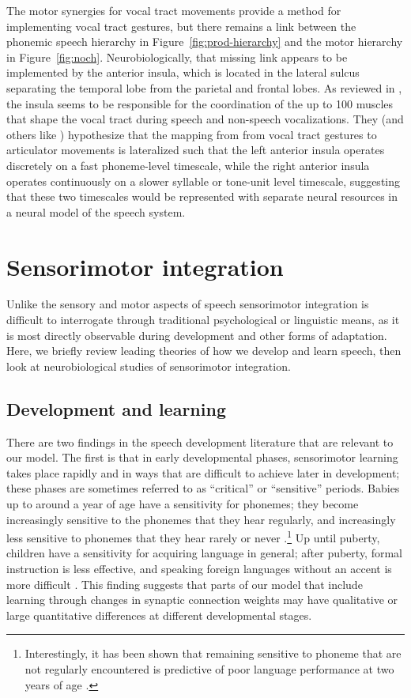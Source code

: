 
The motor synergies for vocal tract movements
provide a method for implementing
vocal tract gestures,
but there remains a link
between the phonemic
speech hierarchy in Figure~\ref{fig:prod-hierarchy}
and the motor hierarchy
in Figure~\ref{fig:noch}.
Neurobiologically,
that missing link appears to be
implemented by the anterior insula,
which is located in the lateral sulcus
separating the temporal lobe from
the parietal and frontal lobes.
As reviewed in \citet{ackermann2004},
the insula seems to be responsible
for the coordination of the up to 100 muscles
that shape the vocal tract during speech
and non-speech vocalizations.
They (and others like \citealt{ivry1998})
hypothesize that the mapping from
from vocal tract gestures to articulator movements
is lateralized such that
the left anterior insula operates
discretely on a fast phoneme-level timescale,
while the right anterior insula
operates continuously on a slower
syllable or tone-unit level timescale,
suggesting that these two timescales
would be represented
with separate neural resources
in a neural model of the speech system.

\section{Sensorimotor integration}

Unlike the sensory and motor aspects of speech
sensorimotor integration
is difficult to interrogate through
traditional psychological or linguistic means,
as it is most directly observable
during development and other forms of adaptation.
Here, we briefly review leading theories
of how we develop and learn speech,
then look at neurobiological studies
of sensorimotor integration.

\subsection{Development and learning}

There are two findings in the
speech development literature
that are relevant to our model.
The first is that in
early developmental phases,
sensorimotor learning
takes place rapidly
and in ways that are difficult
to achieve later in development;
these phases are sometimes referred
to as ``critical'' or ``sensitive'' periods.
Babies up to around a year of age
have a sensitivity for phonemes;
they become increasingly sensitive
to the phonemes that they hear regularly,
and increasingly less sensitive
to phonemes that they hear rarely or never
\citep{kuhl2008}.\footnote{
  Interestingly, it has been shown that
  remaining sensitive to phoneme
  that are not regularly encountered
  is predictive of poor language performance
  at two years of age \citep{kuhl2008}.}
Up until puberty,
children have a sensitivity for
acquiring language in general;
after puberty, formal instruction
is less effective,
and speaking foreign languages
without an accent is more difficult
\citep{hurford1991}.
This finding suggests that
parts of our model
that include learning
through changes in synaptic connection weights
may have qualitative or large quantitative
differences at different developmental stages.

